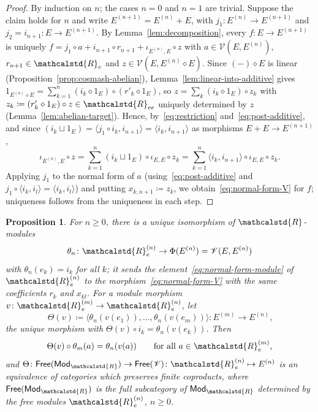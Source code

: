 \documentclass[reqno,a4paper]{amsart}
\theoremstyle{plain}
\newtheorem{proposition}[subsection]{Proposition}
\theoremstyle{definition}
\newcommand{\DefEq}{\coloneq}
\newcommand{\V}{\ensuremath{\mathcal{V}}}
\newcommand{\R}{\ensuremath{\mathcalstd{R}}}
\newcommand{\Mod}{\ensuremath{\mathsf{Mod}}}
\newcommand{\Free}{\ensuremath{\mathsf{Free}}}
\newcommand{\cosmash}{\ensuremath{\diamond}}
\newcommand{\cosum}{\ensuremath{\sqcup}}                   %
\renewcommand{\Re}{\ensuremath{\R_{e}}}
\newcommand{\Ree}{\ensuremath{\R_{ee}}}
\begin{document}
\begin{proof}
  By induction on \(n\); the cases \(n=0\) and \(n=1\) are trivial. Suppose the claim holds for \(n\) and write \(E^{(n+1)}=E^{(n)}+E\), with \(j_{1}\colon E^{(n)}\to E^{(n+1)}\) and \(j_{2}=i_{n+1}\colon E\to E^{(n+1)}\). By Lemma~\ref{lem:decomposition}, every \(f\colon E\to E^{(n+1)}\) is uniquely \(f=j_{1}\circ a+i_{n+1}\circ r_{n+1}+\iota_{E^{(n)},E}\circ z\) with \(a\in\V(E,E^{(n)})\), \(r_{n+1}\in\Re\) and \(z\in\V(E,E^{(n)}\cosmash E)\). Since \((-)\cosmash E\) is linear (Proposition~\ref{prop:cosmash-abelian}), Lemma~\ref{lem:linear-into-additive} gives \(1_{E^{(n)}\cosmash E}=\sum_{k=1}^{n}(i_{k}\cosmash 1_{E})\circ(r'_{k}\cosmash 1_{E})\), so \(z=\sum_{k}(i_{k}\cosmash 1_{E})\circ z_{k}\) with \(z_{k}\DefEq(r'_{k}\cosmash 1_{E})\circ z\in\Ree\) uniquely determined by \(z\) (Lemma~\ref{lem:abelian-target}). Hence, by~\eqref{eq:restriction} and~\eqref{eq:post-additive}, and since \((i_{k}\cosum 1_{E})=\langle j_{1}\circ i_{k},i_{n+1}\rangle=\langle i_{k},i_{n+1}\rangle\) as morphisms \(E+E\to E^{(n+1)}\),
  \[
    \iota_{E^{(n)},E}\circ z=\sum_{k=1}^{n}(i_{k}\cosum 1_{E})\circ\iota_{E,E}\circ z_{k}=\sum_{k=1}^{n}\langle i_{k},i_{n+1}\rangle\circ\iota_{E,E}\circ z_{k}\text{.}
  \]
  Applying \(j_{1}\) to the normal form of \(a\) (using~\eqref{eq:post-additive} and \(j_{1}\circ\langle i_{k},i_{l}\rangle=\langle i_{k},i_{l}\rangle\)) and putting \(x_{k,n+1}\DefEq z_{k}\), we obtain~\eqref{eq:normal-form-V} for \(f\); uniqueness follows from the uniqueness in each step.
\end{proof}

\begin{proposition}\label{prop:Theta}
  For \(n\geq 0\), there is a unique isomorphism of \(\R\)-modules
  \[
    \theta_{n}\colon \Re^{(n)}\to\Phi(E^{(n)})=\V(E,E^{(n)})
  \]
  with \(\theta_{n}(e_{k})=i_{k}\) for all \(k\); it sends the element~\eqref{eq:normal-form-module} of \(\Re^{(n)}\) to the morphism~\eqref{eq:normal-form-V} with the same coefficients \(r_{k}\) and \(x_{kl}\). For a module morphism \(v\colon \Re^{(m)}\to\Re^{(n)}\), let
  \[
    \Theta(v)\DefEq\langle\theta_{n}(v(e_{1})),\dots,\theta_{n}(v(e_{m}))\rangle\colon E^{(m)}\to E^{(n)}\text{,}
  \]
  the unique morphism with \(\Theta(v)\circ i_{k}=\theta_{n}(v(e_{k}))\). Then
  \begin{equation}\label{eq:Theta-theta}
    \Theta(v)\circ\theta_{m}(a)=\theta_{n}(v(a))\qquad\text{for all \(a\in\Re^{(m)}\),}
  \end{equation}
  and \(\Theta\colon \Free(\Mod_{\R})\to\Free(\V)\colon \Re^{(n)}\mapsto E^{(n)}\) is an equivalence of categories which preserves finite coproducts, where \(\Free(\Mod_{\R})\) is the full subcategory of \(\Mod_{\R}\) determined by the free modules \(\Re^{(n)}\), \(n\geq 0\).
\end{proposition}
\end{document}
